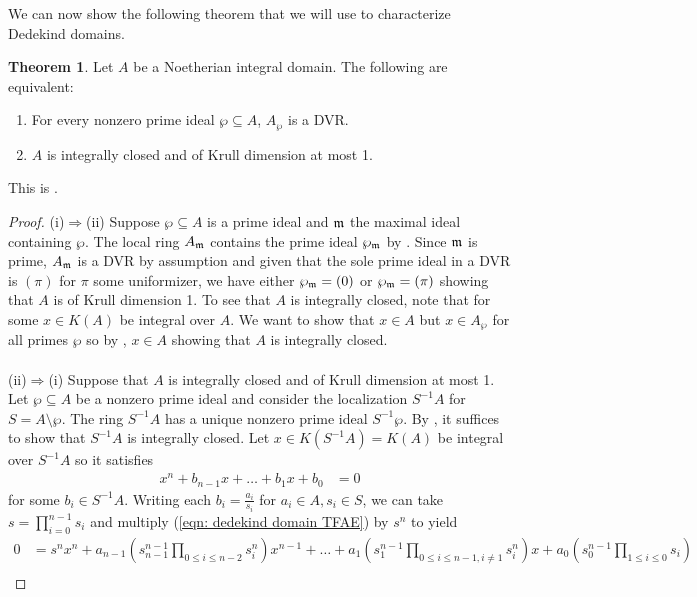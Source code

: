 \documentclass{amsart}
\theoremstyle{definition}
\newtheorem{theorem}{Theorem}[section]
\numberwithin{equation}{section}
\begin{document}
We can now show the following theorem that we will use to characterize Dedekind domains. 
\begin{theorem}\label{thm: dedekind TFAE}
  Let $A$ be a Noetherian integral domain. The following are equivalent:
  \begin{enumerate}[label=(\roman*)]
    \item For every nonzero prime ideal $\wp\subseteq A$, $A_{\wp}$ is a DVR. 
    \item $A$ is integrally closed and of Krull dimension at most 1. 
  \end{enumerate}
\end{theorem}
This is \cite[Ch. 1, \S 1, Prop. 4]{Serre}. 
\begin{proof}
  (i)$\Longrightarrow$(ii) Suppose $\wp\subseteq A$ is a prime ideal and $\mathfrak{m}$ the maximal ideal containing $\wp$. The local ring $A_{\mathfrak{m}}$ contains the prime ideal $\wp_{\mathfrak{m}}$ by . Since $\mathfrak{m}$ is prime, $A_{\mathfrak{m}}$ is a DVR by assumption and given that the sole prime ideal in a DVR is $(\pi)$ for $\pi$ some uniformizer, we have either $\wp_{\mathfrak{m}}=(0)$ or $\wp_{\mathfrak{m}}=(\pi)$ showing that $A$ is of Krull dimension 1. To see that $A$ is integrally closed, note that for some $x\in K(A)$ be integral over $A$. We want to show that $x\in A$ but $x\in A_{\wp}$ for all primes $\wp$ so by , $x\in A$ showing that $A$ is integrally closed. 
  \\\\
  (ii)$\Longrightarrow$(i) Suppose that $A$ is integrally closed and of Krull dimension at most 1. Let $\wp\subseteq A$ be a nonzero prime ideal and consider the localization $S^{-1}A$ for $S=A\setminus\wp$. The ring $S^{-1}A$ has a unique nonzero prime ideal $S^{-1}\wp$. By , it suffices to show that $S^{-1}A$ is integrally closed. Let $x\in K(S^{-1}A)=K(A)$ be integral over $S^{-1}A$ so it satisfies
  \begin{align}\label{eqn: dedekind domain TFAE}
    x^{n}+b_{n-1}x+\dots+b_{1}x+b_{0} &= 0
  \end{align}
  for some $b_{i}\in S^{-1}A$. Writing each $b_{i}=\frac{a_{i}}{s_{i}}$ for $a_{i}\in A, s_{i}\in S$, we can take $s=\prod_{i=0}^{n-1}s_{i}$ and multiply (\ref{eqn: dedekind domain TFAE}) by $s^{n}$ to yield 
  \small
  \begin{align*}
    0 &= s^{n}x^{n}+a_{n-1}\left(s_{n-1}^{n-1}\prod_{0\leq i\leq n-2}s_{i}^{n}\right)x^{n-1}+\dots+a_{1}\left(s_{1}^{n-1}\prod_{0\leq i\leq n-1, i\neq 1}s_{i}^{n}\right)x+a_{0}\left(s_{0}^{n-1}\prod_{1\leq i\leq 0}s_{i}\right) \\

\end{align*}
\end{proof}
\end{document}
